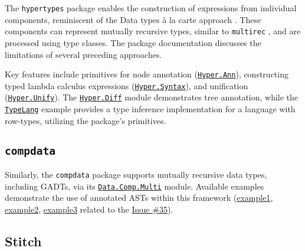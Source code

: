 The \texttt{hypertypes} package \cite{hypertypes-hackage} enables the construction of expressions from individual components, reminiscent of the Data types à la carte approach \cite{swierstra-data-2008}. These components can represent mutually recursive types, similar to \texttt{multirec} \cite{multirec-hackage}, and are processed using type classes. The package documentation discusses the limitations of several preceding approaches.

Key features include primitives for node annotation (\href{https://hackage.haskell.org/package/hypertypes-0.2.2/docs/Hyper-Combinator-Ann.html}{\texttt{Hyper.Ann}}), constructing typed lambda calculus expressions (\href{https://hackage.haskell.org/package/hypertypes-0.2.2/docs/Hyper-Syntax.html}{\texttt{Hyper.Syntax}}), and unification (\href{https://hackage.haskell.org/package/hypertypes-0.2.2/docs/Hyper-Unify.html}{\texttt{Hyper.Unify}}). The \href{https://github.com/lamdu/hypertypes/blob/06cf48ef9c85c54cbe722a448754cb89931b23e7/src/Hyper/Diff.hs}{\texttt{Hyper.Diff}} module demonstrates tree annotation, while the \href{https://github.com/lamdu/hypertypes/tree/06cf48ef9c85c54cbe722a448754cb89931b23e7/test/TypeLang.hs}{\texttt{TypeLang}} example provides a type inference implementation for a language with row-types, utilizing the package's primitives.

\subsection{\texttt{compdata}}
\label{chap:LiteratureReview:sec:AstRepresentations:Compdata}

Similarly, the \texttt{compdata} package \cite{compdata-hackage} supports mutually recursive data types, including GADTs, via its \href{https://hackage.haskell.org/package/compdata-0.13.1/docs/Data-Comp-Multi.html}{\texttt{Data.Comp.Multi}} module. Available examples demonstrate the use of annotated ASTs within this framework (\href{https://github.com/pa-ba/compdata/blob/e916a9ae847b37d7932669f9365de987d09fd9e0/src/Data/Comp/Multi.hs#L322}{example1}, \href{https://github.com/pa-ba/compdata/blob/e916a9ae847b37d7932669f9365de987d09fd9e0/examples/Examples/Multi/Desugar.hs}{example2}, \href{https://gist.github.com/liarokapisv/bb857a23ecd9df945690f73e0acfbe80}{example3} related to the \href{https://github.com/pa-ba/compdata/issues/35}{Issue \#35}).

\subsection{Stitch}
\label{chap:LiteratureReview:sec:AstRepresentations:Stitch}

